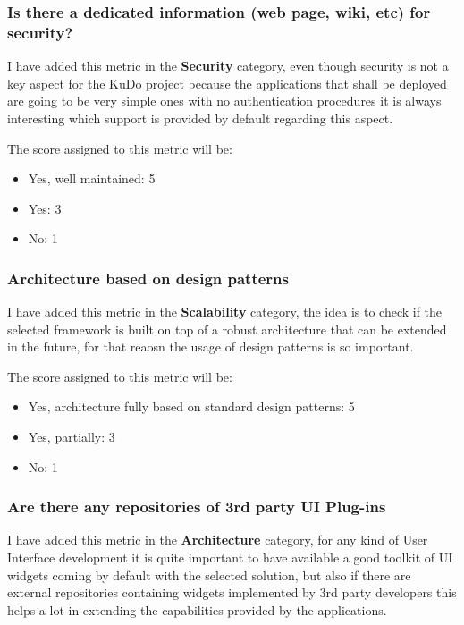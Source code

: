 \documentclass[a4paper,12pt]{book}
\begin{document}
\subsubsection{Is there a dedicated information (web page, wiki, etc) for security?}
\label{Is there a dedicated information (web page, wiki, etc) for security?}

I have added this metric in the \textbf{Security} category, even though security is not a key aspect for the KuDo project because the applications that shall be deployed are going to be very simple ones with no authentication procedures it is always interesting which support is provided by default regarding this aspect.

The score assigned to this metric will be:
\begin{itemize}
 \item Yes, well maintained: 5
 \item Yes: 3
 \item No: 1
\end{itemize}

\subsubsection{Architecture based on design patterns}
\label{Architecture based on design patterns}

I have added this metric in the \textbf{Scalability} category, the idea is to check if the selected framework is built on top of a robust architecture that can be extended in the future, for that reaosn the usage of design patterns is so important.

The score assigned to this metric will be:
\begin{itemize}
 \item Yes, architecture fully based on standard design patterns: 5
 \item Yes, partially: 3
 \item No: 1
\end{itemize}

\subsubsection{Are there any repositories of 3rd party UI Plug-ins}
\label{Are there any repositories of 3rd party UI Plug-ins}

I have added this metric in the \textbf{Architecture} category, for any kind of User Interface development it is quite important to have available a good toolkit of UI widgets coming by default with the selected solution, but also if there are external repositories containing widgets implemented by 3rd party developers this helps a lot in extending the capabilities provided by the applications.
\end{document}
